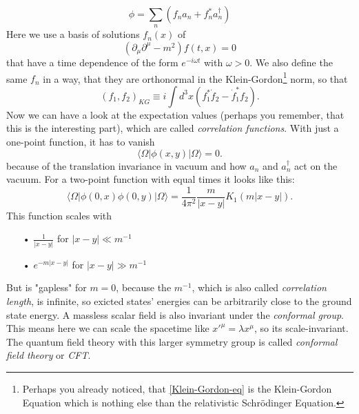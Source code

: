 		\begin{equation} \label{wave_fct}
			\phi = \sum_n \left(f_n a_n + f^*_n a^{\dagger}_n \right)
		\end{equation}
	Here we use a basis of solutions $f_n(x)$ of
		\begin{equation} \label{Klein-Gordon-eq}
			\left( \partial_{\mu}\partial^{\mu} - m^2 \right) f(t,x)=0
		\end{equation}			
	that have a time dependence of the form $e^{-i\omega t}$ with $\omega>0$. We also define the same $f_n$ in a way, that they are orthonormal in the Klein-Gordon\footnote{Perhaps you already noticed, that \eqref{Klein-Gordon-eq} is the Klein-Gordon Equation which is nothing else than the relativistic Schrödinger Equation.} norm, so that
		\begin{equation}
			(f_1,f_2)_{KG} \equiv
			i \int d^3x \left( f^*_1 \dot{f}_2 - \dot{f}^*_1 f_2
			\right).
		\end{equation}
	Now we can have a look at the expectation values (perhaps you remember, that this is the interesting part), which are called \textit{correlation functions}. With just a one-point function, it has to vanish
		\begin{equation}
			\langle \Omega| \phi(x,y) |\Omega \rangle = 0.
		\end{equation}
	because of the translation invariance in vacuum and how $a_n$ and $a^{\dagger}_n$ act on the vacuum. 
	For a two-point function with equal times it looks like this:
		\begin{equation}
			\langle \Omega| \phi(0,x)\phi(0,y) |\Omega\rangle=
			\frac{1}{4\pi^2}\frac{m}{|x-y|}K_1(m|x-y|).
		\end{equation}
	This function scales with 
		\begin{itemize}
			\item[•] $\frac{1}{|x-y|}$ for $|x-y| \ll m^{-1}$
			\item[•] $e^{-m|x-y|}$ for $|x-y| \gg m^{-1}$
		\end{itemize}
	But is "gapless" for $m=0$, because the $m^{-1}$, which is also called \textit{correlation length}, is infinite, so exicted states' energies can be arbitrarily close to the ground state energy. A massless scalar field is also invariant under the \textit{conformal group}. This means here we can scale the spacetime like $x'^\mu = \lambda x^\mu$, so its scale-invariant. The quantum field theory with this larger symmetry group is called \textit{conformal field theory} or \textit{CFT}.\\
	
